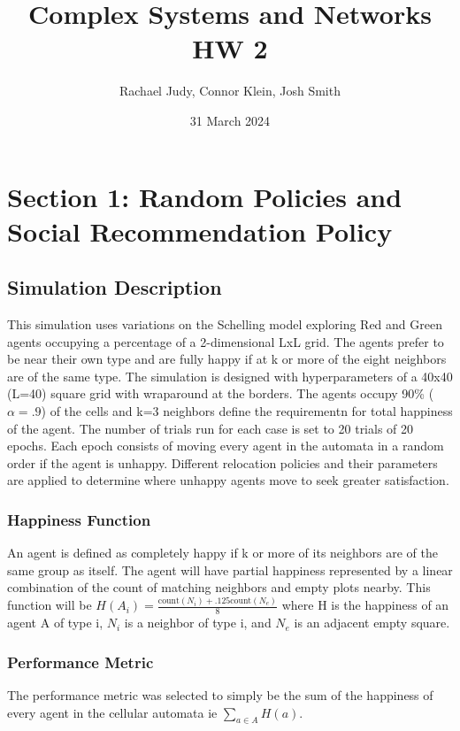 \documentclass[11pt]{article}
\title{Complex Systems and Networks HW 2}
\author{Rachael Judy, Connor Klein, Josh Smith}
\date{31 March 2024}
\begin{document}
	\pgfplotsset{compat=1.18}
	
	\maketitle
\section{Section 1: Random Policies and Social Recommendation Policy}\label{sec:q1}
\subsection{Simulation Description}\label{subsec:simulation}
This simulation uses variations on the Schelling model exploring Red and Green agents occupying a percentage of a 2-dimensional LxL grid. The agents prefer to be near their own type and are fully happy if at k or more of the eight neighbors are of the same type. The simulation is designed with hyperparameters of a 40x40 (L=40) square grid with wraparound at the borders. The agents occupy 90\% ($\alpha=.9$) of the cells and k=3 neighbors define the requirementn for total happiness of the agent. The number of trials run for each case is set to 20 trials of 20 epochs. Each epoch consists of moving every agent in the automata in a random order if the agent is unhappy. Different relocation policies and their parameters are applied to determine where unhappy agents move to seek greater satisfaction.

\subsubsection{Happiness Function}
An agent is defined as completely happy if k or more of its neighbors are of the same group as itself. The agent will have partial happiness represented by a linear combination of the count of matching neighbors and empty plots nearby. This function will be $H(A_i) = \frac{\text{count}(N_i) + .125 \text{count}(N_e)}{8}$ where H is the happiness of an agent A of type i, $N_i$ is a neighbor of type i, and $N_e$ is an adjacent empty square.

\subsubsection{Performance Metric}
The performance metric was selected to simply be the sum of the happiness of every agent in the cellular automata ie $\sum\limits_{a \in A} H(a)$.
\end{document}
